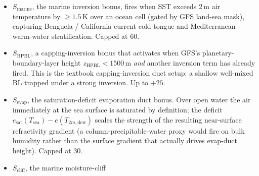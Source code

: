 \documentclass[11pt,a4paper]{article}
\begin{document}
\begin{itemize}[nosep]
        $T_{2m}$ to the lapse-adjusted temperature at the first
        pressure level $\ge\!200$\,m above ground; threshold
        1\,K, capped at 100.  The lapse adjustment uses the same
        expected-lapse depth cap (600\,m here: the target level
        is typically ${\sim}$320\,m over ocean, unaffected, but
        over high terrain it can sit 1--2\,km up, where an
        uncapped expected drop of 6.5--13\,K would make \emph{any}
        stable profile read as a multi-kelvin surface
        ``inversion'' at 10\,M-units per kelvin).
        The bonus credits only the \emph{sub-grid remainder}:
        the inversion already resolved between the pressure
        levels spanning the same height range is subtracted
        before thresholding.  The bonus exists to compensate
        inversions the level set smooths over; when the levels
        themselves show the temperature rise, the M-profile terms
        have already measured its true refractive effect,
        \emph{wet term included}, and re-billing it would paint
        cold lakes and coastal-upwelling zones (air warm aloft,
        resolved 8--10\,K inversions, sub-refractive moisture
        structure) at full ducting strength in cells Hepburn's
        fields correctly show as below normal.
  \item $S_{\text{marine}}$, the marine inversion bonus, fires
        when SST exceeds 2\,m air temperature by $\ge\!1.5$\,K
        over an ocean cell (gated by GFS land-sea mask), capturing
        Benguela / California-current cold-tongue and Mediterranean
        warm-water stratification.  Capped at 60.
  \item $S_{\text{HPBL}}$, a capping-inversion bonus that activates
        when GFS's planetary-boundary-layer height $z_{\text{HPBL}}
        < 1500$\,m \emph{and} another inversion term has already
        fired.  This is the textbook capping-inversion duct setup:
        a shallow well-mixed BL trapped under a strong inversion.
        Up to $+25$.
  \item $S_{\text{evap}}$, the saturation-deficit evaporation duct
        bonus.  Over open water the air immediately at the sea
        surface is saturated by definition; the deficit
        $e_{\text{sat}}(T_{\text{sea}}) - e(T_{2m,\text{dew}})$
        scales the strength of the resulting near-surface
        refractivity gradient (a
        column-precipitable-water proxy would fire on bulk
        humidity rather than the surface gradient that actually
        drives evap-duct height).  Capped at 30.
  \item $S_{\text{cliff}}$, the marine moisture-cliff

\end{itemize}
\end{document}
